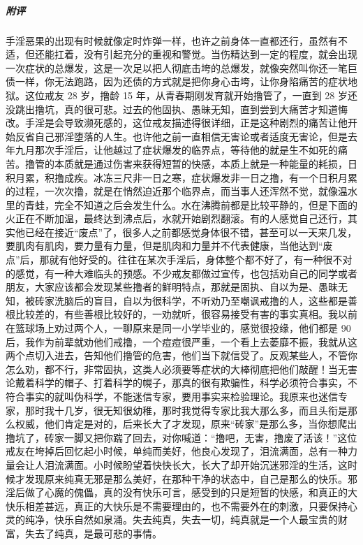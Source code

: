 \begin{case}
    \subparagraph{附评} 手淫恶果的出现有时候就像定时炸弹一样，也许之前身体一直都还行，虽然有不适，但还能扛着，没有引起充分的重视和警觉。当伤精达到一定的程度，就会出现一次症状的总爆发，这是一次足以把人彻底击垮的总爆发，就像突然叫你还一笔巨债一样，你无法跑路，因为还债的方式就是把你身心击垮，让你身陷痛苦的症状地狱。这位戒友 28 岁，撸龄 15 年，从青春期刚发育就开始撸管了，一直到 28 岁还没跳出撸坑，真的很可悲。过去的他固执、愚昧无知，直到尝到大痛苦才知道悔改。手淫是会导致濒死感的，这位戒友描述得很详细，正是这种剧烈的痛苦让他开始反省自己邪淫堕落的人生。也许他之前一直相信无害论或者适度无害论，但是去年九月那次手淫后，让他越过了症状爆发的临界点，等待他的就是生不如死的痛苦。撸管的本质就是通过伤害来获得短暂的快感，本质上就是一种能量的耗损，日积月累，积撸成疾。冰冻三尺非一日之寒，症状爆发非一日之撸，有一个日积月累的过程，一次次撸，就是在悄然迫近那个临界点，而当事人还浑然不觉，就像温水里的青蛙，完全不知道之后会发生什么。水在沸腾前都是比较平静的，但是下面的火正在不断加温，最终达到沸点后，水就开始剧烈翻滚。有的人感觉自己还行，其实他已经在接近“废点”了，很多人之前都感觉身体很不错，甚至可以一天来几发，要肌肉有肌肉，要力量有力量，但是肌肉和力量并不代表健康，当他达到“废点”后，那就有他好受的。往往在某次手淫后，身体整个都不好了，有一种很不对的感觉，有一种大难临头的预感。不少戒友都做过宣传，也包括劝自己的同学或者朋友，大家应该都会发现某些撸者的鲜明特点，那就是固执、自以为是、愚昧无知，被砖家洗脑后的盲目，自以为很科学，不听劝乃至嘲讽戒撸的人，这些都是善根比较差的，有些善根比较好的，一劝就听，很容易接受有害的事实真相。我以前在篮球场上劝过两个人，一聊原来是同一小学毕业的，感觉很投缘，他们都是 90 后，我作为前辈就劝他们戒撸，一个痘痘很严重，一个看上去萎靡不振，我就从这两个点切入进去，告知他们撸管的危害，他们当下就信受了。反观某些人，不管你怎么劝，都不行，非常固执，这类人必须要等症状的大棒彻底把他们敲醒！当无害论戴着科学的帽子、打着科学的幌子，那真的很有欺骗性，科学必须符合事实，不符合事实的就叫伪科学，不能迷信专家，要用事实来检验理论。我原来也迷信专家，那时我十几岁，很无知很幼稚，那时我觉得专家比我大那么多，而且头衔是那么权威，他们肯定是对的，后来长大了才发现，原来“砖家”是那么多，当你想爬出撸坑了，砖家一脚又把你踹了回去，对你喊道：“撸吧，无害，撸废了活该！”这位戒友在垮掉后回忆起小时候，单纯而美好，他良心发现了，泪流满面，总有一种力量会让人泪流满面。小时候盼望着快快长大，长大了却开始沉迷邪淫的生活，这时候才发现原来纯真无邪是那么美好，在那种干净的状态中，自己是那么的快乐。邪淫后做了心魔的傀儡，真的没有快乐可言，感受到的只是短暂的快感，和真正的大快乐相差甚远，真正的大快乐是不需要理由的，也不需要外在的刺激，只要保持心灵的纯净，快乐自然如泉涌。失去纯真，失去一切，纯真就是一个人最宝贵的财富，失去了纯真，是最可悲的事情。
\end{case}

